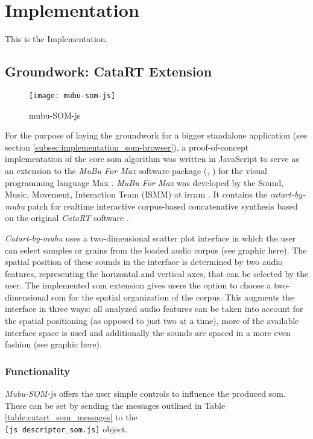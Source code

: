 
\section{Implementation}
\label{sec:implementation}
This is the Implementation.

\subsection{Groundwork: CataRT Extension}

\begin{figure}[!htb]
  \centering
  \texttt{[image: mubu-som-js]}
  \caption{mubu-SOM-js}
  \label{fig:mubu-som}
\end{figure}

\label{subsec:implementation_catart}
For the purpose of laying the groundwork for a bigger standalone application
(see section \ref{subsec:implementation_som-browser}), a proof-of-concept
implementation of the core \gls{som} algorithm was written in JavaScript to
serve as an extension to the \textit{MuBu For Max} software package
(\citet{web:mubu2019}, \citet{web:mubu2019_2}) for the visual programming
language Max \citep{web:max2019}. \textit{MuBu For Max} was developed by the
Sound, Music, Movement, Interaction Team (ISMM) at \gls{ircam}
\citep{schnell2009}. It contains the \textit{catart-by-mubu} patch for
realtime interactive corpus-based concatenative synthesis based on the original
\textit{CataRT} software \citep{schwarz2006}.

\smallskip

\textit{Catart-by-mubu} uses a
two-dimensional scatter plot interface in which the user can select samples or
grains from the loaded audio corpus (see
graphic here).
The spatial position of these sounds in the interface is determined by two audio
features, representing the horizontal and vertical axes, that can be selected by
the user.
The implemented \gls{som} extension gives users the option to choose a
two-dimensional \gls{som} for the spatial organization of the corpus. This
augments the interface in three ways: all analyzed audio features can be
taken into account for the spatial positioning (as opposed to just two at a
time), more of the available interface space is used and additionally the sounds
are spaced in a more even fashion (see
graphic here).

\subsubsection{Functionality}
\label{subsubec:mubu-som_functionality}
\textit{Mubu-SOM-js} offers the user simple controls to influence the produced
\gls{som}. These can be set by sending the messages outlined in Table
\ref{table:catart_som_messages} to the \\ \texttt{[js descriptor\_som.js]}
object.

